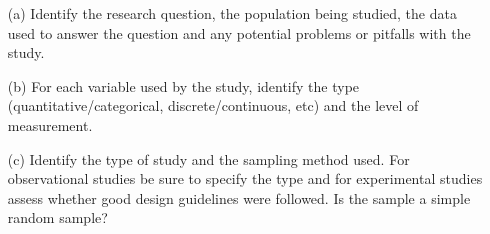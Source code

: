\documentclass{article}
\begin{document}
\begin{flushleft}
\begin{itemize}
\item [(a)] Identify the research question, the population being studied, the data used to answer the question and any potential problems or pitfalls with the study.
\vspace{1.5in}
\item[(b)] For each variable used by the study, identify the type (quantitative/categorical, discrete/continuous, etc) and the level of measurement.
\vspace{1.5in}
\item[(c)] Identify the type of study and the sampling method used. For observational studies be sure to specify the type and for experimental studies assess whether good design guidelines were followed. Is the sample a simple random sample?
\end{itemize}

\end{flushleft}
\end{document}
